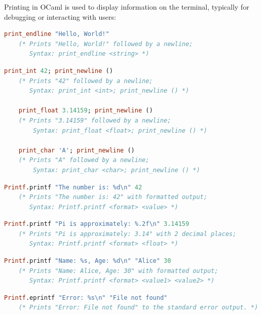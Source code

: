 \begin{Def}

    Printing in OCaml is used to display information on the terminal, typically for debugging or interacting with users:
    
    \begin{lstlisting}[language=OCaml, caption={Printing a String}, numbers=none]
    print_endline "Hello, World!"
    (* Prints "Hello, World!" followed by a newline;
       Syntax: print_endline <string> *)
    \end{lstlisting}
    
    \begin{lstlisting}[language=OCaml, caption={Printing Integers, Floats, and Characters}, numbers=none]
    print_int 42; print_newline ()
    (* Prints "42" followed by a newline;
       Syntax: print_int <int>; print_newline () *)
    
    print_float 3.14159; print_newline ()
    (* Prints "3.14159" followed by a newline;
        Syntax: print_float <float>; print_newline () *)

    print_char 'A'; print_newline ()
    (* Prints "A" followed by a newline;
        Syntax: print_char <char>; print_newline () *)
    \end{lstlisting}
    
    \begin{lstlisting}[language=OCaml, caption={Formatted Printing with Printf}, numbers=none]
    Printf.printf "The number is: %d\n" 42
    (* Prints "The number is: 42" with formatted output;
       Syntax: Printf.printf <format> <value> *)
    \end{lstlisting}
    
    \begin{lstlisting}[language=OCaml, caption={Formatted Printing for Floats}, numbers=none]
    Printf.printf "Pi is approximately: %.2f\n" 3.14159
    (* Prints "Pi is approximately: 3.14" with 2 decimal places;
       Syntax: Printf.printf <format> <float> *)
    \end{lstlisting}
    
    \begin{lstlisting}[language=OCaml, caption={Printing Multiple Values}, numbers=none]
    Printf.printf "Name: %s, Age: %d\n" "Alice" 30
    (* Prints "Name: Alice, Age: 30" with formatted output;
       Syntax: Printf.printf <format> <value1> <value2> *)
    \end{lstlisting}

    
    \begin{lstlisting}[language=OCaml, caption={Using Printf.eprintf for Error Messages}, numbers=none]
    Printf.eprintf "Error: %s\n" "File not found"
    (* Prints "Error: File not found" to the standard error output. *)
    \end{lstlisting}
    
    \end{Def}
    
